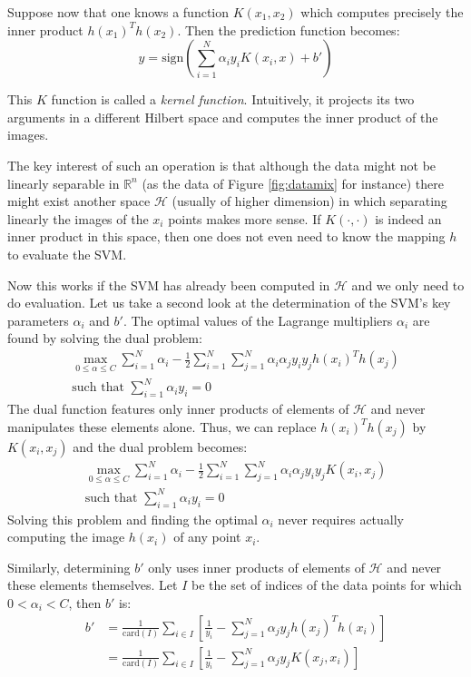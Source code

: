 \documentclass{article}
\begin{document}
Suppose now that one knows a function $K(x_1,x_2)$ which computes precisely the inner product $h(x_1)^T h(x_2)$. Then the prediction function becomes:
\begin{equation*}
y = \text{sign}\left( \sum_{i=1}^N \alpha_i y_i K(x_i,x) + b' \right)
\end{equation*}

This $K$ function is called a \emph{kernel function}. Intuitively, it  projects its two arguments in a different Hilbert space and computes the inner product of the images.

The key interest of such an operation is that although the data might not be linearly separable in $\mathbb{R}^n$ (as the data of Figure \ref{fig:datamix} for instance) there might exist another space $\mathcal{H}$ (usually of higher dimension) in which separating linearly the images of the $x_i$ points makes more sense. If $K(\cdot,\cdot)$ is  indeed an inner product in this space, then one does not even need to know the mapping $h$ to evaluate the SVM.

Now this works if the SVM has already been computed in $\mathcal{H}$ and we only need to do evaluation. Let us take a second look at the determination of the SVM's key parameters $\alpha_i$ and $b'$. The optimal values of the Lagrange multipliers $\alpha_i$ are found by solving the dual problem:
\begin{gather*}
\max_{0\leq\alpha\leq C} \sum_{i=1}^N \alpha_i - \frac{1}{2} \sum_{i=1}^N \sum_{j=1}^N  \alpha_i \alpha_j y_i y_j h(x_i)^T h(x_j)\\
\text{such that } \sum_{i=1}^N \alpha_i y_i = 0
\end{gather*}
The dual function features only inner products of elements of $\mathcal{H}$ and never manipulates these elements alone. Thus, we can replace $h(x_i)^T h(x_j)$ by $K(x_i,x_j)$ and the dual problem becomes: 
\begin{gather*}
\max_{0\leq\alpha\leq C} \sum_{i=1}^N \alpha_i - \frac{1}{2} \sum_{i=1}^N \sum_{j=1}^N  \alpha_i \alpha_j y_i y_j K(x_i,x_j)\\
\text{such that } \sum_{i=1}^N \alpha_i y_i = 0
\end{gather*}
Solving this problem and finding the optimal $\alpha_i$ never requires actually computing the image $h(x_i)$ of any point $x_i$.

Similarly, determining $b'$ only uses inner products of elements of $\mathcal{H}$ and never these elements themselves. Let $I$ be the set of indices of the data points for which $0<\alpha_i<C$, then $b'$ is:
\begin{align*}
b' &= \frac{1}{\text{card}(I)} \sum_{i \in I} \left[ \frac{1}{y_i} - \sum_{j=1}^N \alpha_j y_j h(x_j)^T h(x_i) \right]\\
&= \frac{1}{\text{card}(I)} \sum_{i \in I} \left[ \frac{1}{y_i} - \sum_{j=1}^N \alpha_j y_j K(x_j, x_i) \right]
\end{align*}
\end{document}
